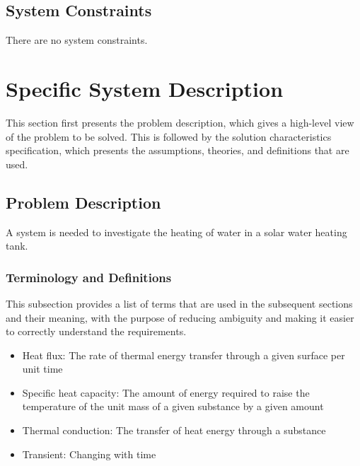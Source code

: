 \documentclass[12pt]{article}
\begin{document}
\subsection{System Constraints}
\label{Sec:SysConstraints}
There are no system constraints.
\section{Specific System Description}
\label{Sec:SpecSystDesc}
This section first presents the problem description, which gives a high-level view of the problem to be solved. This is followed by the solution characteristics specification, which presents the assumptions, theories, and definitions that are used.
\subsection{Problem Description}
\label{Sec:ProbDesc}
A system is needed to investigate the heating of water in a solar water heating tank.
\subsubsection{Terminology and Definitions}
\label{Sec:TermDefs}
This subsection provides a list of terms that are used in the subsequent sections and their meaning, with the purpose of reducing ambiguity and making it easier to correctly understand the requirements.
\begin{itemize}
\item{Heat flux: The rate of thermal energy transfer through a given surface per unit time}
\item{Specific heat capacity: The amount of energy required to raise the temperature of the unit mass of a given substance by a given amount}
\item{Thermal conduction: The transfer of heat energy through a substance}
\item{Transient: Changing with time}
\end{itemize}
\end{document}
